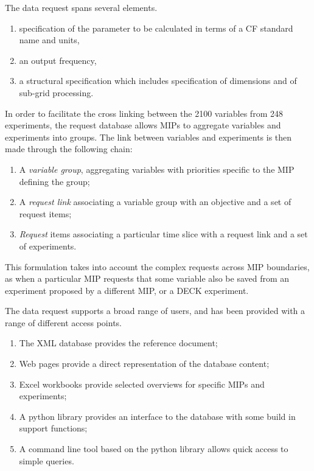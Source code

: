 \documentclass[gmd,manuscript]{copernicus}
\begin{document}
The data request spans several elements.

\begin{enumerate}
\item specification of the parameter to be calculated in terms of a CF
  standard name and units,
\item an output frequency,
\item a structural specification which includes specification of
  dimensions and of sub-grid processing.
\end{enumerate}

In order to facilitate the cross linking between the 2100 variables
from 248 experiments, the request database allows MIPs to aggregate
variables and experiments into groups. The link between variables and
experiments is then made through the following chain:

\begin{enumerate}
\item A \emph{variable group}, aggregating variables with priorities
  specific to the MIP defining the group;
\item A \emph{request link} associating a variable group with an
  objective and a set of request items;
\item \emph{Request} items associating a particular time slice with a
  request link and a set of experiments.
\end{enumerate}

This formulation takes into account the complex requests across MIP
boundaries, as when a particular MIP requests that some variable also
be saved from an experiment proposed by a different MIP, or a DECK
experiment.

The data request supports a broad range of users, and has been
provided with a range of different access points.

\begin{enumerate}
\item The XML database provides the reference document;
\item Web pages provide a direct representation of the database
  content;
\item Excel workbooks provide selected overviews for specific MIPs and
  experiments;
\item A python library provides an interface to the database with some
  build in support functions;
\item A command line tool based on the python library allows quick
  access to simple queries.
\end{enumerate}
\end{document}
